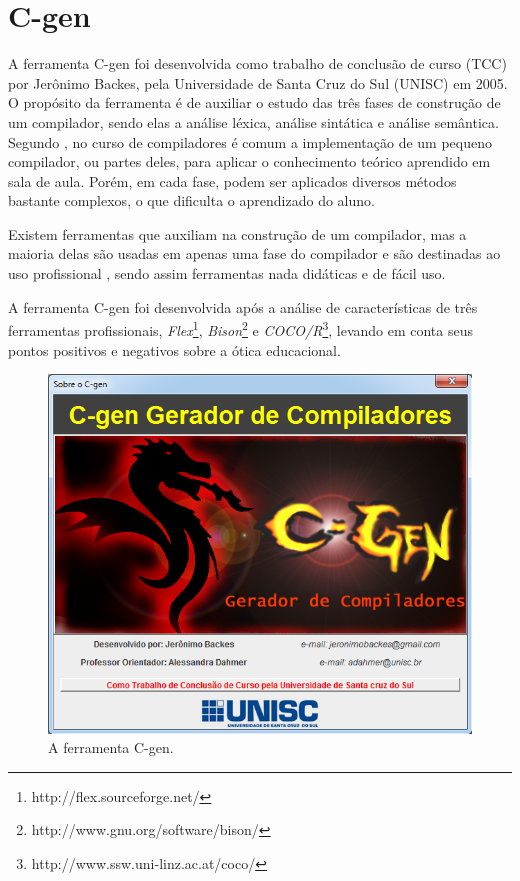 \section{C-gen}
\label{sec:cgen}
A ferramenta C-gen foi desenvolvida como trabalho de conclusão de curso (TCC) por Jerônimo Backes, pela Universidade de Santa Cruz do Sul (UNISC) em 2005. O propósito da ferramenta é de auxiliar o estudo das três fases de construção de um compilador, sendo elas a análise léxica, análise sintática e análise semântica. Segundo \cite{cgen}, no curso de compiladores é comum a implementação de um pequeno compilador, ou partes deles, para aplicar o conhecimento teórico aprendido em sala de aula. Porém, em cada fase, podem ser aplicados diversos métodos bastante complexos, o que dificulta o aprendizado do aluno. 

Existem ferramentas que auxiliam na construção de um compilador, mas a maioria delas são usadas em apenas uma fase do compilador e são destinadas ao uso profissional \cite{cgen}, sendo assim ferramentas nada didáticas e de fácil uso.  

A ferramenta C-gen foi desenvolvida após a análise de características de três ferramentas profissionais, \textit{Flex}\footnote{http://flex.sourceforge.net/}, \textit{Bison}\footnote{http://www.gnu.org/software/bison/} e \textit{COCO/R}\footnote{http://www.ssw.uni-linz.ac.at/coco/}, levando em conta seus pontos positivos e negativos sobre a ótica educacional. 

\begin{figure}[ht!]
	\centering
	\includegraphics[scale=0.7]{imgs/cgen.png}
	\caption{A ferramenta C-gen.}
	\label{cgen-inicial}
\end{figure}

